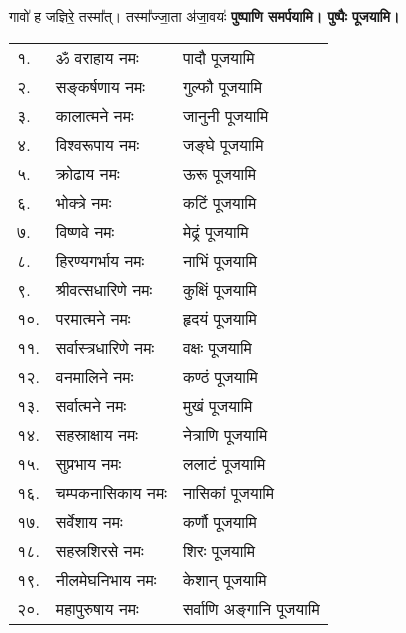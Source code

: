 \begin{center}
{गावो॑ ह जज्ञिरे॒ तस्मा᳚त्। तस्मा᳚ज्जा॒ता अ॑जा॒वयः॑}
\textbf{\devAya{} पुष्पाणि समर्पयामि।  पुष्पैः पूजयामि।}

\begin{longtable}{ll@{— }l}
१.&	ॐ वराहाय नमः & पादौ पूजयामि	\\
२.&	सङ्कर्षणाय नमः & गुल्फौ पूजयामि\\
३.&	कालात्मने नमः & जानुनी पूजयामि	\\
४.&	विश्वरूपाय नमः & जङ्घे पूजयामि\\
५.&	क्रोढाय नमः & ऊरू पूजयामि	\\
६.&	भोक्त्रे नमः & कटिं पूजयामि	\\
७.&	विष्णवे नमः & मेढ्रं पूजयामि		\\
८.&	हिरण्यगर्भाय नमः & नाभिं पूजयामि\\
९.&	श्रीवत्सधारिणे नमः & कुक्षिं पूजयामि	\\
१०.& परमात्मने नमः & हृदयं पूजयामि\\
११.& सर्वास्त्रधारिणे नमः & वक्षः पूजयामि	\\
१२.& वनमालिने नमः & कण्ठं पूजयामि\\
१३.& सर्वात्मने नमः & मुखं पूजयामि	\\
१४.& सहस्राक्षाय नमः & नेत्राणि पूजयामि\\
१५.& सुप्रभाय नमः & ललाटं पूजयामि	\\
१६.& चम्पकनासिकाय नमः & नासिकां पूजयामि	\\
१७.& सर्वेशाय नमः & कर्णौ पूजयामि	\\
१८.& सहस्रशिरसे नमः & शिरः पूजयामि\\
१९.& नीलमेघनिभाय नमः & केशान् पूजयामि	\\
२०.& महापुरुषाय नमः & सर्वाणि अङ्गानि पूजयामि	\\
\end{longtable}


\end{center}
